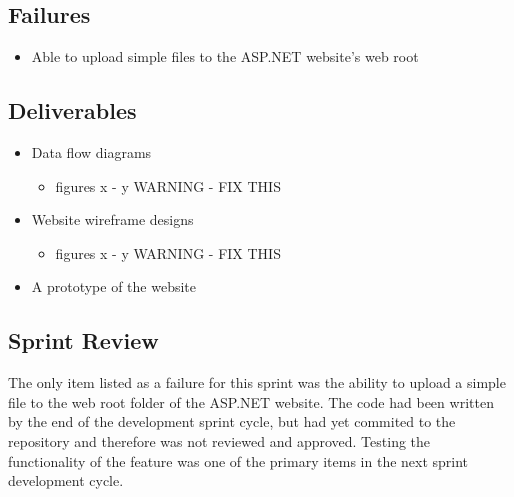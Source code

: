     \subsection{Failures}
    \label{sec:Sprint1_failures}
        \begin{itemize} 
            \item Able to upload simple files to the ASP.NET website's web root
        \end{itemize}

    \subsection{Deliverables}
    \label{sec:Sprint1_deliverables}
    \begin{itemize}
        \item Data flow diagrams
            \begin{itemize} \item figures x - y WARNING - FIX THIS \end{itemize} %
        \item Website wireframe designs
            \begin{itemize} \item figures x - y WARNING - FIX THIS \end{itemize} %
        \item A prototype of the website
    \end{itemize}

    \subsection{Sprint Review}
    \label{sec:Sprint1_review}
        \hspace{7mm}
        The only item listed as a failure for this sprint was the ability to upload a simple file
        to the web root folder of the ASP.NET website.  The code had been written by the end of the 
        development sprint cycle, but had yet commited to the repository and therefore was not 
        reviewed and approved.  Testing the functionality of the feature was one of the primary 
        items in the next sprint development cycle.

